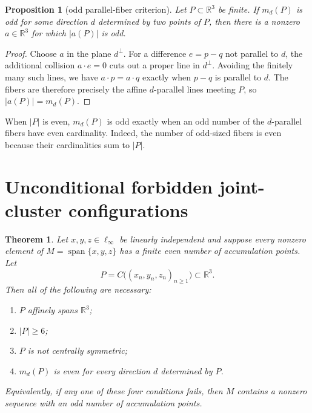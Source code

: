 \documentclass[11pt]{article}
\newtheorem{theorem}{Theorem}
\newtheorem{proposition}{Proposition}
\newcommand{\R}{\mathbb R}
\begin{document}
\begin{proposition}[odd parallel-fiber criterion]\label{prop:fibers}
Let $P\subset\R^3$ be finite.  If $m_d(P)$ is odd for some direction $d$
determined by two points of $P$, then there is a nonzero $a\in\R^3$ for which
$|a(P)|$ is odd.
\end{proposition}

\begin{proof}
Choose $a$ in the plane $d^\perp$.  For a difference $e=p-q$ not parallel to
$d$, the additional collision $a\cdot e=0$ cuts out a proper line in
$d^\perp$.  Avoiding the finitely many such lines, we have
$a\cdot p=a\cdot q$ exactly when $p-q$ is parallel to $d$.  The fibers are
therefore precisely the affine $d$-parallel lines meeting $P$, so
$|a(P)|=m_d(P)$.
\end{proof}

When $|P|$ is even, $m_d(P)$ is odd exactly when an odd number of the
$d$-parallel fibers have even cardinality.  Indeed, the number of odd-sized
fibers is even because their cardinalities sum to $|P|$.

\section{Unconditional forbidden joint-cluster configurations}

\begin{theorem}\label{thm:subcases}
Let $x,y,z\in\ell_\infty$ be linearly independent and suppose every nonzero
element of $M=\operatorname{span}\{x,y,z\}$ has a finite even number of
accumulation points.  Let
\[
 P=C\bigl((x_n,y_n,z_n)_{n\ge1}\bigr)\subset\R^3.
\]
Then all of the following are necessary:
\begin{enumerate}
\item $P$ affinely spans $\R^3$;
\item $|P|\ge6$;
\item $P$ is not centrally symmetric;
\item $m_d(P)$ is even for every direction $d$ determined by $P$.
\end{enumerate}
Equivalently, if any one of these four conditions fails, then $M$ contains a
nonzero sequence with an odd number of accumulation points.
\end{theorem}
\end{document}
